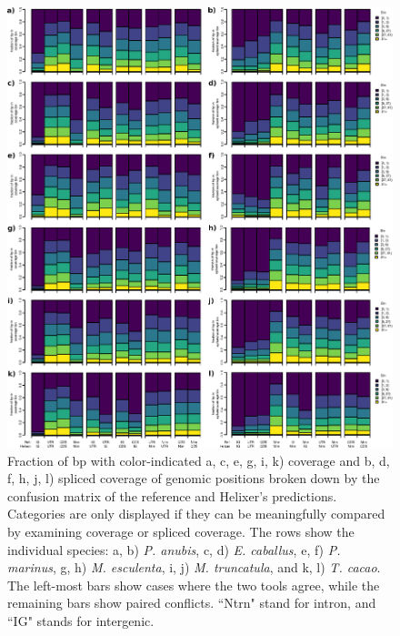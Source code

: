 \documentclass{article}
\renewcommand{\thefigure}{S\arabic{figure}}
\begin{document}
\begin{figure}[!h]
\label{supfig:each_sp_vs_ref}
\centerline{\includegraphics[]{images/cov_examples/each_sp_vs_ref}}
\caption{
Fraction of bp with color-indicated a, c, e, g, i, k) coverage and b, d, f, h, j, l) spliced coverage of genomic positions
broken down by the confusion matrix of the reference and Helixer's predictions. Categories
are only displayed if they can be meaningfully compared by examining coverage or spliced
coverage. The rows show the individual species: a, b) {\it P. anubis}, c, d) {\it E. caballus}, e, f) {\it P. marinus}, 
g, h) {\it M. esculenta}, i, j) {\it M. truncatula}, and k, l) {\it T. cacao}. 
The left-most bars show cases where the two tools agree,
while the remaining bars show paired conflicts. ``Ntrn" stand
for intron, and ``IG" stands for intergenic.
}
\end{figure}


\clearpage
\renewcommand\refname{Supplemental References}


\clearpage
\end{document}

